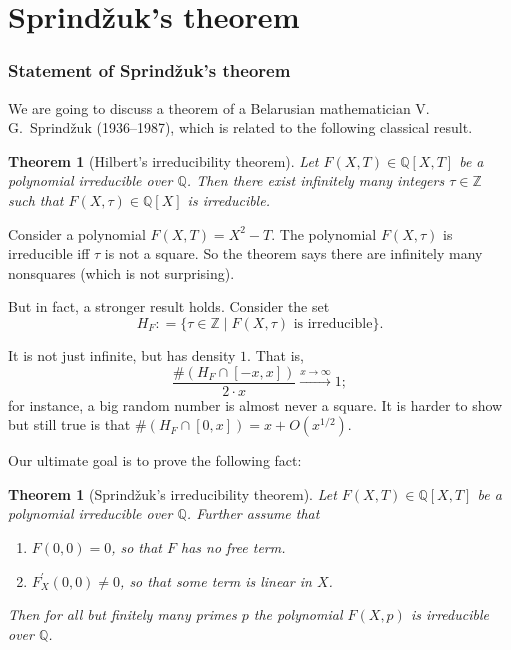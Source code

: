 \documentclass{article}
\newcommand{\dfn}{\mathrel{\mathop:}=}
\newcommand{\ZZ}{\mathbb{Z}}
\newcommand{\QQ}{\mathbb{Q}}
\newcommand{\examplesymbol}{$\blacktriangle$}
\renewcommand{\qedsymbol}{$\blacksquare$}
\theoremstyle{myplain}
\newtheorem{theorem}[proposition]{Theorem}
\theoremstyle{mydefinition}
\newenvironment{example}
  {\pushQED{\qed}\renewcommand{\qedsymbol}{\examplesymbol}\examplex}
  {\popQED\endexamplex}
\begin{document}
\pagebreak

\part{Sprind\v{z}uk's theorem}

\section{Statement of Sprind\v{z}uk's theorem}

We are going to discuss a theorem of a Belarusian mathematician
V.\,G.~Sprind\v{z}uk (1936--1987), which is related to the following classical
result.

\begin{theorem}[Hilbert's irreducibility theorem]
  Let $F (X,T) \in \QQ [X,T]$ be a polynomial irreducible over $\QQ$. Then there
  exist infinitely many integers $\tau \in \ZZ$ such that
  $F (X,\tau) \in \QQ [X]$ is irreducible.
\end{theorem}

\begin{example}
  Consider a polynomial $F (X,T) = X^2 - T$. The polynomial $F (X,\tau)$ is
  irreducible iff $\tau$ is not a square. So the theorem says there are
  infinitely many nonsquares (which is not surprising).
\end{example}

But in fact, a stronger result holds. Consider the set
$$H_F \dfn \{ \tau \in \ZZ \mid F (X,\tau) \text{ is irreducible} \}.$$

It is not just infinite, but has density $1$. That is,
$$\frac{\# (H_F \cap [-x, x])}{2\cdot x} \xrightarrow{x\to\infty} 1;$$
for instance, a big random number is almost never a square. It is harder to
show but still true is that $\# (H_F \cap [0, x]) = x + O (x^{1/2})$.

\vspace{1em}

Our ultimate goal is to prove the following fact:

\begin{theorem}[Sprind\v{z}uk's irreducibility theorem]
  Let $F (X,T) \in \QQ [X,T]$ be a polynomial irreducible over $\QQ$. Further
  assume that
  \begin{enumerate}
  \item $F (0,0) = 0$, so that $F$ has no free term.

  \item $F^\prime_X (0,0) \ne 0$, so that some term is linear in $X$.
  \end{enumerate}
  Then for all but finitely many primes $p$ the polynomial $F (X,p)$ is
  irreducible over $\QQ$.
\end{theorem}
\end{document}
